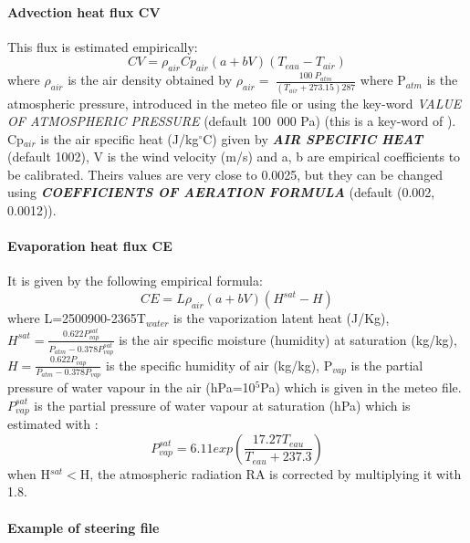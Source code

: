 \paragraph{ Advection heat flux CV}

 This flux is estimated empirically:
\begin{equation*}
CV=\rho_{air}Cp_{air}\left(a+bV \right)\left(T_{eau}-T_{air} \right)
\end{equation*}
 where $\rho_{air}$ is the air density obtained by ${\rho }_{air}=\ \frac{100\ P_{atm}}{\left(T_{air}+273.15\right)287}$ where P${}_{atm}$ is the atmospheric pressure, introduced in the meteo file or using the key-word \textit{VALUE OF ATMOSPHERIC PRESSURE} (default 100~000 Pa) (this is a key-word of ). Cp${}_{air}$ is the air specific heat (J/kg${}^\circ$C) given by \textbf{\textit{AIR SPECIFIC HEAT}} (default 1002), V is the wind velocity (m/s) and a, b are empirical coefficients to be calibrated. Theirs values are very close to 0.0025, but they can be changed using \textbf{\textit{COEFFICIENTS OF AERATION FORMULA}} (default (0.002, 0.0012)).


\paragraph{ Evaporation heat flux CE}

 It is given by the following empirical formula:
\begin{equation*}
CE=L\rho_{air}\left(a+bV \right) \left(H^{sat}-H \right)
\end{equation*}
 where L=2500900-2365T${}_{water}$ is the vaporization latent heat (J/Kg), $H^{sat}=\frac{0.622P^{sat}_{vap}}{P_{atm}-0.378P^{sat}_{vap}}$ is the air specific moisture (humidity) at saturation (kg/kg), $H=\frac{0.622P_{vap}}{P_{atm}-0.378P_{vap}}$ is the specific humidity of air (kg/kg), P${}_{vap}$ is the partial pressure of water vapour in the air (hPa=10${}^{5}$Pa) which is given in the meteo file. $P^{sat}_{vap}$ is the partial pressure of water vapour at saturation (hPa) which is estimated with :
\begin{equation*}
P^{sat}_{vap}=6.11exp\left(\frac{17.27T_{eau}}{T_{eau}+237.3} \right)
\end{equation*}
 when H${}^{sat}<$H, the atmospheric radiation RA is corrected by multiplying it with 1.8.


\paragraph{ Example of steering file}


